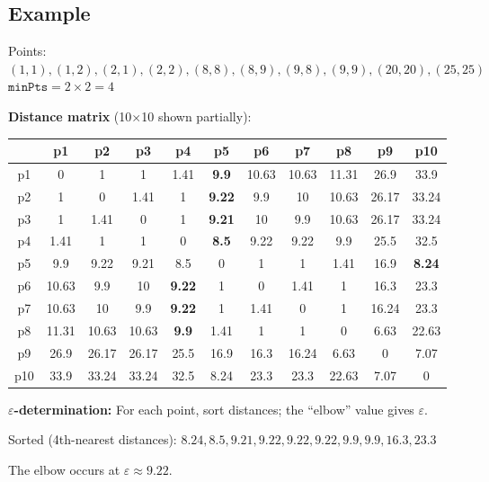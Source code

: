 \documentclass[12pt,a4paper]{article}
\begin{document}
\subsection{Example}

\begin{examplebox}
Points: $(1,1),(1,2),(2,1),(2,2),(8,8),(8,9),(9,8),(9,9),(20,20),(25,25)$\\
$\texttt{minPts} = 2 \times 2 = 4$

\textbf{Distance matrix} (10$\times$10 shown partially):

\begin{center}
\begin{tabular}{c|cccccccccc}
 & p1 & p2 & p3 & p4 & p5 & p6 & p7 & p8 & p9 & p10 \\
\hline
p1 & 0 & 1 & 1 & 1.41 & \textbf{9.9} & 10.63 & 10.63 & 11.31 & 26.9 & 33.9 \\
p2 & 1 & 0 & 1.41 & 1 & \textbf{9.22} & 9.9 & 10 & 10.63 & 26.17 & 33.24 \\
p3 & 1 & 1.41 & 0 & 1 & \textbf{9.21} & 10 & 9.9 & 10.63 & 26.17 & 33.24 \\
p4 & 1.41 & 1 & 1 & 0 & \textbf{8.5} & 9.22 & 9.22 & 9.9 & 25.5 & 32.5 \\
p5 & 9.9 & 9.22 & 9.21 & 8.5 & 0 & 1 & 1 & 1.41 & 16.9 & \textbf{8.24} \\
p6 & 10.63 & 9.9 & 10 & \textbf{9.22} & 1 & 0 & 1.41 & 1 & 16.3 & 23.3 \\
p7 & 10.63 & 10 & 9.9 & \textbf{9.22} & 1 & 1.41 & 0 & 1 & 16.24 & 23.3 \\
p8 & 11.31 & 10.63 & 10.63 & \textbf{9.9} & 1.41 & 1 & 1 & 0 & 6.63 & 22.63 \\
p9 & 26.9 & 26.17 & 26.17 & 25.5 & 16.9 & 16.3 & 16.24 & 6.63 & 0 & 7.07 \\
p10 & 33.9 & 33.24 & 33.24 & 32.5 & 8.24 & 23.3 & 23.3 & 22.63 & 7.07 & 0 \\
\end{tabular}
\end{center}

\textbf{$\varepsilon$-determination:} For each point, sort distances; the ``elbow'' value gives $\varepsilon$.

Sorted (4th-nearest distances): $8.24, 8.5, 9.21, 9.22, 9.22, 9.22, 9.9, 9.9, 16.3, 23.3$

The elbow occurs at $\varepsilon \approx 9.22$.


\end{examplebox}
\end{document}
